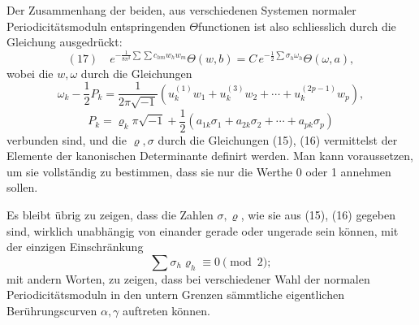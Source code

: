 \documentclass[10pt]{article}
\begin{document}
Der Zusammenhang der beiden, aus verschiedenen Systemen normaler Periodicitätsmoduln entspringenden \(\Theta\)functionen ist also schliesslich durch die Gleichung ausgedrückt:
\[
(17)\quad
e^{-\frac{1}{8\pi^2}\sum\sum c_{hm}w_hw_m}\Theta(w,b)
=
C\,e^{-\frac12\sum\sigma_h\omega_h}\Theta(\omega,a),
\]
wobei die \(w,\omega\) durch die Gleichungen
\[
\omega_k-\frac12P_k=
\frac{1}{2\pi\sqrt{-1}}
\left(u_k^{(1)}w_1+u_k^{(3)}w_2+\cdots+u_k^{(2p-1)}w_p\right),
\]
\[
P_k=\varrho_k\pi\sqrt{-1}+\frac12(a_{1k}\sigma_1+a_{2k}\sigma_2+\cdots+a_{pk}\sigma_p)
\]
verbunden sind, und die \(\varrho,\sigma\) durch die Gleichungen (15), (16) vermittelst der Elemente der kanonischen Determinante definirt werden. Man kann voraussetzen, um sie vollständig zu bestimmen, dass sie nur die Werthe 0 oder 1 annehmen sollen.

Es bleibt übrig zu zeigen, dass die Zahlen \(\sigma,\varrho\), wie sie aus (15), (16) gegeben sind, wirklich unabhängig von einander gerade oder ungerade sein können, mit der einzigen Einschränkung
\[
\sum\sigma_h\varrho_h\equiv0\pmod{2};
\]
mit andern Worten, zu zeigen, dass bei verschiedener Wahl der normalen Periodicitätsmoduln in den untern Grenzen sämmtliche eigentlichen Berührungscurven \(\alpha,\gamma\) auftreten können.
\end{document}
